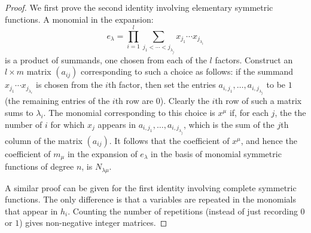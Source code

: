 \documentclass[11pt]{amsart}
\theoremstyle{definition}
\theoremstyle{example}
\begin{document}
\begin{proof}
  We first prove the second identity involving elementary symmetric functions.
  A monomial in the expansion:
  \begin{displaymath}
    e_\lambda = \prod_{i=1}^l \sum_{j_1<\dotsb<j_{\lambda_j}}x_{j_1}\dotsb x_{j_{\lambda_i}}
  \end{displaymath}
  is a product of summands, one chosen from each of the $l$ factors.
  Construct an $l\times m$ matrix $(a_{ij})$ corresponding to such a choice as follows:
  if the summand $x_{j_1}\dotsb x_{j_{\lambda_i}}$ is chosen from the $i$th factor, then set the entries $a_{i,j_1},\dotsc, a_{i, j_{\lambda_j}}$ to be $1$ (the remaining entries of the $i$th row are $0$).
  Clearly the $i$th row of such a matrix sums to $\lambda_i$.
  The monomial corresponding to this choice is $x^\mu$ if, for each $j$, the the number of $i$ for which $x_j$ appears in $a_{i,j_1},\dotsc, a_{i, j_{\lambda_j}}$, which is the sum of the $j$th column of the matrix $(a_{ij})$.
  It follows that the coefficient of $x^\mu$, and hence the coefficient of $m_\mu$ in the expansion of $e_\lambda$ in the basis of monomial symmetric functions of degree $n$, is $N_{\lambda\mu}$.

A similar proof can be given for the first identity involving complete symmetric functions. The only difference is that a variables are repeated in the monomials that appear in $h_i$. Counting the number of repetitions (instead of just recording $0$ or $1$) gives non-negative integer matrices.
\end{proof}
\end{document}
